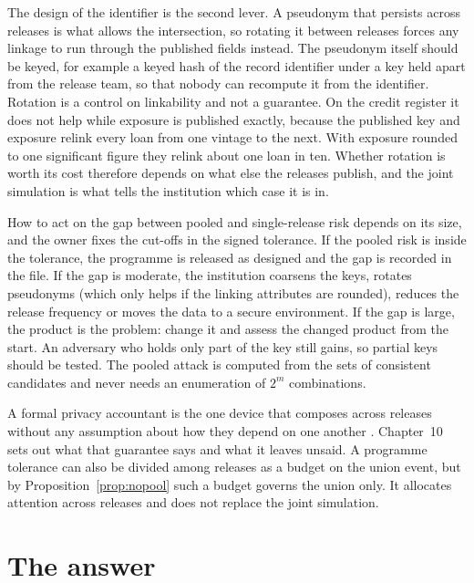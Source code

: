 The design of the identifier is the second lever. A pseudonym that persists across
releases is what allows the intersection, so rotating it between releases forces any
linkage to run through the published fields instead. The pseudonym itself should be
keyed, for example a keyed hash of the record identifier under a key held apart
from the release team, so that nobody can recompute it from the identifier.
Rotation is a control on linkability and not a guarantee. On the credit register it
does not help while exposure is published exactly, because the published key and
exposure relink every loan from one vintage to the next. With exposure rounded to
one significant figure they relink about one loan in ten. Whether rotation is worth
its cost therefore depends on what else the releases publish, and the joint
simulation is what tells the institution which case it is in.

How to act on the gap between pooled and single-release risk depends on its size, and the owner fixes the cut-offs in the signed tolerance. If the pooled risk is inside the tolerance, the programme is released as designed and the gap is recorded in the file. If the gap is moderate, the institution coarsens the keys, rotates pseudonyms (which only helps if the linking attributes are rounded), reduces the release frequency or moves the data to a secure environment. If the gap is large, the product is the problem: change it and assess the changed product from the start. An adversary who holds only part of the key still gains, so partial keys should be tested. The pooled attack is computed from the sets of consistent candidates and never needs an enumeration of $2^m$ combinations.

A formal privacy accountant is the one device that composes across releases without
any assumption about how they depend on one another \citep{dwork2014}. Chapter~10
sets out what that guarantee says and what it leaves unsaid. A programme tolerance
can also be divided among releases as a budget on the union event, but by
Proposition~\ref{prop:nopool} such a budget governs the union only. It allocates
attention across releases and does not replace the joint simulation.

\section{The answer}

